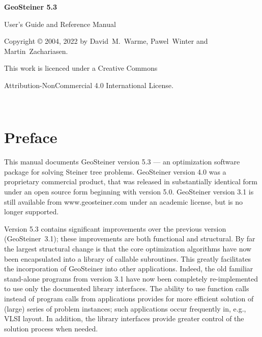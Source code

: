 \documentclass[12pt,twoside,letterpaper]{article}
\def\code#1{{\ttfamily #1}}
\def\geosteiner{Geo\-Steiner}
\newcommand{\GeoSteinerCurrentVersion}{5.3}
\begin{document}
\thispagestyle{empty}
\vspace*{4cm}

\centerline{\Huge\bf \geosteiner{} \GeoSteinerCurrentVersion{}}

\vspace*{3cm}

\centerline{\Large User's Guide and Reference Manual}

\vspace*{10cm}
\centerline{Copyright \copyright{} 2004, 2022 by
 David~M.~Warme, Pawel~Winter and Martin~Zachariasen.}
\centerline{This work is licenced under a Creative Commons}
\centerline{Attribution-NonCommercial 4.0 International License.}

\clearpage
\thispagestyle{empty}
~

\clearpage
{}
\tableofcontents

\clearpage
\setlength{\parskip}{1.5ex plus0.1ex minus0.1ex}
\setlength{\parindent}{0ex}

\pagestyle{headings}
\section*{Preface}

This manual documents \geosteiner{} version
\GeoSteinerCurrentVersion{}
--- an optimization software package for solving Steiner tree
problems.
\geosteiner{} version 4.0 was a proprietary commercial product,
that was released in substantially identical form under an open source
form beginning with version 5.0.
\geosteiner{} version 3.1 is still available from
\code{www.geosteiner.com} under an academic license, but is no
longer supported.

Version \GeoSteinerCurrentVersion{} contains significant improvements
over the previous
version (\geosteiner~3.1); these improvements are both functional and
structural.
By far the largest structural change is that the core
optimization algorithms have now been encapsulated into a library of
callable subroutines.  This greatly facilitates the incorporation of
\geosteiner{} into other applications.  Indeed, the old familiar
stand-alone programs from version 3.1 have now been completely
re-implemented to use only the documented library interfaces.  The
ability to use function calls instead of program calls from
applications provides for more efficient solution of (large) series of
problem instances; such applications occur frequently in, e.g., VLSI
layout.  In addition, the library interfaces provide greater control
of the solution process when needed.
\end{document}
